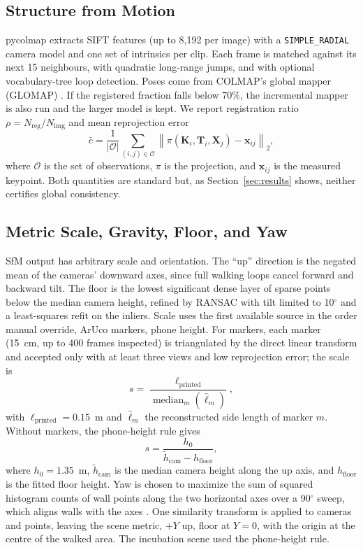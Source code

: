 \documentclass[conference]{IEEEtran}
\begin{document}
\subsection{Structure from Motion}
pycolmap extracts SIFT features (up to 8,192 per image) with a \texttt{SIMPLE\_RADIAL} camera model and one set of intrinsics per clip. Each frame is matched against its next 15 neighbours, with quadratic long-range jumps, and with optional vocabulary-tree loop detection. Poses come from COLMAP's global mapper (GLOMAP) \cite{pan2024glomap}. If the registered fraction falls below 70\%, the incremental mapper \cite{schonberger2016sfm} is also run and the larger model is kept. We report registration ratio $\rho = N_{\mathrm{reg}}/N_{\mathrm{img}}$ and mean reprojection error
\begin{equation}
\bar{e} = \frac{1}{|\mathcal{O}|}\sum_{(i,j)\in\mathcal{O}} \left\lVert \pi\!\left(\mathbf{K}_i,\mathbf{T}_i,\mathbf{X}_j\right) - \mathbf{x}_{ij} \right\rVert_2,
\end{equation}
where $\mathcal{O}$ is the set of observations, $\pi$ is the projection, and $\mathbf{x}_{ij}$ is the measured keypoint. Both quantities are standard but, as Section~\ref{sec:results} shows, neither certifies global consistency.

\subsection{Metric Scale, Gravity, Floor, and Yaw}
SfM output has arbitrary scale and orientation. The ``up'' direction is the negated mean of the cameras' downward axes, since full walking loops cancel forward and backward tilt. The floor is the lowest significant dense layer of sparse points below the median camera height, refined by RANSAC \cite{fischler1981ransac} with tilt limited to 10$^{\circ}$ and a least-squares refit on the inliers. Scale uses the first available source in the order manual override, ArUco markers, phone height. For markers, each marker (15~cm, up to 400 frames inspected) is triangulated by the direct linear transform \cite{hartley2004mvg} and accepted only with at least three views and low reprojection error; the scale is
\begin{equation}
s = \frac{\ell_{\mathrm{printed}}}{\operatorname{median}_m\left(\hat{\ell}_m\right)},
\end{equation}
with $\ell_{\mathrm{printed}}=0.15$~m and $\hat{\ell}_m$ the reconstructed side length of marker $m$. Without markers, the phone-height rule gives
\begin{equation}
s = \frac{h_0}{\tilde{h}_{\mathrm{cam}} - h_{\mathrm{floor}}},
\end{equation}
where $h_0 = 1.35$~m, $\tilde{h}_{\mathrm{cam}}$ is the median camera height along the up axis, and $h_{\mathrm{floor}}$ is the fitted floor height. Yaw is chosen to maximize the sum of squared histogram counts of wall points along the two horizontal axes over a 90$^{\circ}$ sweep, which aligns walls with the axes \cite{coughlan1999manhattan}. One similarity transform is applied to cameras and points, leaving the scene metric, $+Y$ up, floor at $Y=0$, with the origin at the centre of the walked area. The incubation scene used the phone-height rule.
\end{document}
